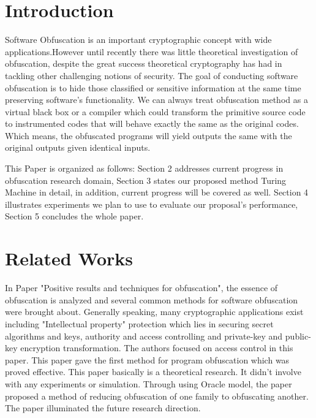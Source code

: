 \documentclass{sig-alternate-05-2015}
\begin{document}

\section{Introduction}
Software Obfuscation is an important cryptographic concept with wide applications\cite{lynn:positive}.However until recently there was little theoretical investigation of obfuscation, despite the great success theoretical cryptography has had in tackling other challenging notions of security. The goal of conducting software obfuscation is to hide those classified or sensitive information at the same time preserving software’s functionality. We can always treat obfuscation method as a virtual black box or a compiler which could transform the primitive source code to instrumented codes that will behave exactly the same as the original codes.  Which means, the obfuscated programs will yield outputs the same with the original outputs given identical inputs.

This Paper is organized as follows: Section 2 addresses current progress in obfuscation research domain, Section 3 states our proposed method Turing Machine in detail, in addition, current progress will be covered as well. Section 4 illustrates experiments we plan to use to  evaluate our proposal's performance, Section 5 concludes the whole paper.

\section{Related Works}
In Paper "Positive results and techniques for obfuscation"\cite{lynn:positive}, the essence of obfuscation is analyzed and several common methods for software obfuscation were brought about. Generally speaking, many cryptographic applications exist including "Intellectual  property" protection which lies in securing secret algorithms and keys, authority and access controlling and private-key and public-key encryption transformation. The authors focused on access control in this paper. This paper gave the first method for program obfuscation which was proved effective. This paper basically is a theoretical research. It didn't involve with any experiments or simulation.  Through using Oracle model, the paper proposed a method of reducing obfuscation of one family to obfuscating another. The paper illuminated the future research direction.
\end{document}
